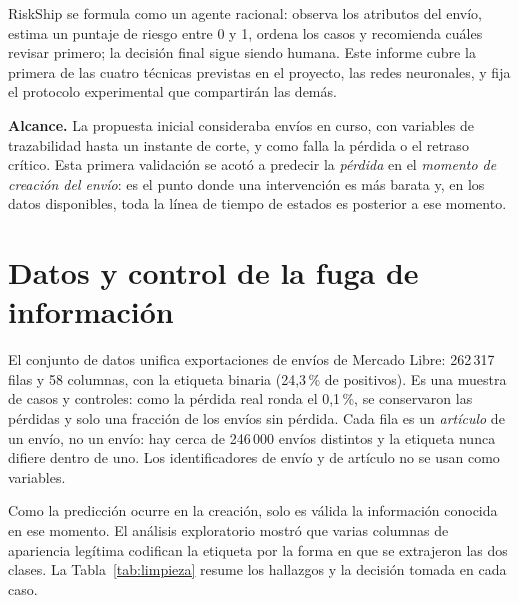 \documentclass[conference]{IEEEtran}
\newcommand{\col}[1]{\texttt{\detokenize{#1}}}
\begin{document}
RiskShip se formula como un agente racional: observa los atributos del envío,
estima un puntaje de riesgo entre 0 y 1, ordena los casos y recomienda cuáles
revisar primero; la decisión final sigue siendo humana. Este informe cubre la
primera de las cuatro técnicas previstas en el proyecto, las redes neuronales,
y fija el protocolo experimental que compartirán las demás.

\textbf{Alcance.} La propuesta inicial consideraba envíos en curso, con
variables de trazabilidad hasta un instante de corte, y como falla la pérdida
o el retraso crítico. Esta primera validación se acotó a predecir la
\emph{pérdida} en el \emph{momento de creación del envío}: es el punto donde
una intervención es más barata y, en los datos disponibles, toda la línea de
tiempo de estados es posterior a ese momento.

\section{Datos y control de la fuga de información}

El conjunto de datos unifica exportaciones de envíos de Mercado Libre:
262\,317 filas y 58 columnas, con la etiqueta binaria \col{is_lost} (24,3\,\%
de positivos). Es una muestra de casos y controles: como la pérdida real
ronda el 0,1\,\%, se conservaron las pérdidas y solo una fracción de los envíos
sin pérdida. Cada fila es un \emph{artículo} de un envío, no un envío: hay
cerca de 246\,000 envíos distintos y la etiqueta nunca difiere dentro de uno.
Los identificadores de envío y de artículo no se usan como variables.

Como la predicción ocurre en la creación, solo es válida la información
conocida en ese momento. El análisis exploratorio mostró que varias columnas
de apariencia legítima codifican la etiqueta por la forma en que se extrajeron
las dos clases. La Tabla~\ref{tab:limpieza} resume los hallazgos y la decisión
tomada en cada caso.
\end{document}

